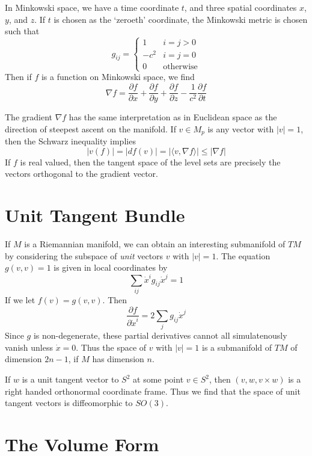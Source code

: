 \begin{example}
    In Minkowski space, we have a time coordinate $t$, and three spatial coordinates $x$, $y$, and $z$. If $t$ is chosen as the `zeroeth' coordinate, the Minkowski metric is chosen such that
    \[ g_{ij} = \begin{cases} 1 & i = j > 0 \\ -c^2 & i = j = 0 \\ 0 & \text{otherwise} \end{cases} \]
    Then if $f$ is a function on Minkowski space, we find
    \[ \nabla f = \frac{\partial f}{\partial x} + \frac{\partial f}{\partial y} + \frac{\partial f}{\partial z} - \frac{1}{c^2} \frac{\partial f}{\partial t} \]
\end{example}

The gradient $\nabla f$ has the same interpretation as in Euclidean space as the direction of steepest ascent on the manifold. If $v \in M_p$ is any vector with $|v| = 1$, then the Schwarz inequality implies
%
\[ |v(f)| = |df(v)| = |\langle v, \nabla f \rangle| \leq |\nabla f| \]
%
If $f$ is real valued, then the tangent space of the level sets are precisely the vectors orthogonal to the gradient vector.

\section{Unit Tangent Bundle}

If $M$ is a Riemannian manifold, we can obtain an interesting submanifold of $TM$ by considering the subspace of {\it unit} vectors $v$ with $|v| = 1$. The equation $g(v,v) = 1$ is given in local coordinates by
%
\[ \sum_{ij} \dot{x}^i g_{ij} \dot{x}^j = 1 \]
%
If we let $f(v) = g(v,v)$. Then
%
\[ \frac{\partial f}{\partial \dot{x}^i} = 2 \sum_j g_{ij} \dot{x}^j \]
%
Since $g$ is non-degenerate, these partial derivatives cannot all simulatenously vanish unless $\dot{x} = 0$. Thus the space of $v$ with $|v| = 1$ is a submanifold of $TM$ of dimension $2n - 1$, if $M$ has dimension $n$.

\begin{example}
    If $w$ is a unit tangent vector to $S^2$ at some point $v \in S^2$, then $(v,w,v \times w)$ is a right handed orthonormal coordinate frame. Thus we find that the space of unit tangent vectors is diffeomorphic to $SO(3)$.
\end{example}

\section{The Volume Form}

